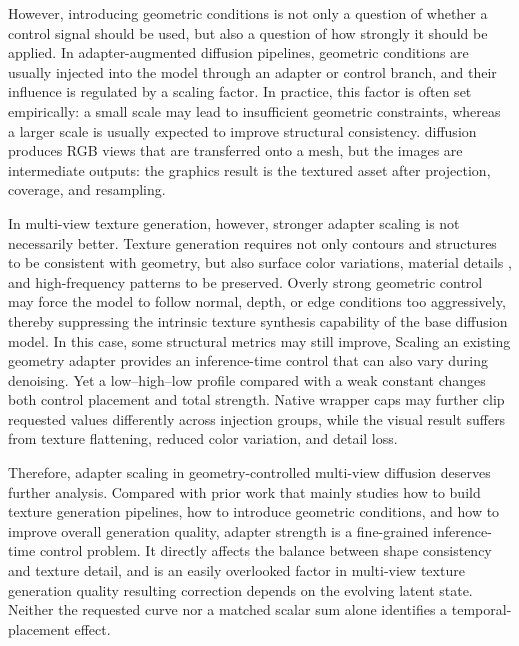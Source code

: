 \documentclass[times,twocolumn,final]{elsarticle}
\providecommand{\DIFadd}[1]{{\protect\color{blue} \sf #1}} %
\providecommand{\DIFdel}[1]{{\protect\color{red} \scriptsize #1}} %
\providecommand{\DIFaddbegin}{} %
\providecommand{\DIFaddend}{} %
\providecommand{\DIFdelbegin}{} %
\providecommand{\DIFdelend}{} %
\begin{document}
\DIFdel{However, introducing geometric conditions is not only a question of whether a control signal should be used, but also a question of how strongly it should be applied. In adapter-augmented diffusion pipelines, geometric conditions are usually injected into the model through an adapter or control branch, and their influence is regulated by a scaling factor. In practice, this factor is often set empirically: a small scale may lead to insufficient geometric constraints, whereas a larger scale is usually expected to improve structural consistency.
}\DIFdelend \DIFaddbegin \DIFadd{diffusion produces RGB views that are transferred onto a mesh, but the images are intermediate outputs: the graphics result is the textured asset after projection, coverage, and resampling.
}\DIFaddend

\DIFdelbegin \DIFdel{In multi-view texture generation, however, stronger adapter scaling is not necessarily better. Texture generation requires not only contours and structures to be consistent with geometry, but also surface color variations, material details , and high-frequency patterns to be preserved. Overly strong geometric control may force the model to follow normal, depth, or edge conditions too aggressively, thereby suppressing the intrinsic texture synthesis capability of the base diffusion model. In this case, some structural metrics may still improve, }\DIFdelend \DIFaddbegin \DIFadd{Scaling an existing geometry adapter provides an inference-time control that can also vary during denoising. Yet a low--high--low profile compared with a weak constant changes both control placement and total strength. Native wrapper caps may further clip requested values differently across injection groups, }\DIFaddend while the \DIFdelbegin \DIFdel{visual result suffers from texture flattening, reduced color variation, and detail loss. }%

\DIFdel{Therefore, adapter scaling in geometry-controlled multi-view diffusion deserves further analysis. Compared with prior work that mainly studies how to build texture generation pipelines, how to introduce geometric conditions, and how to improve overall generation quality, adapter strength is a fine-grained inference-time control problem. It directly affects the balance between shape consistency and texture detail, and is an easily overlooked factor in multi-view texture generation quality}\DIFdelend \DIFaddbegin \DIFadd{resulting correction depends on the evolving latent state. Neither the requested curve nor a matched scalar sum alone identifies a temporal-placement effect}\DIFaddend .
\end{document}
